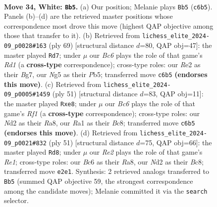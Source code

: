 \documentclass[11pt]{article}
\begin{document}
\clearpage

\begin{figure}[p]\centering
\begin{subfigure}{0.46\textwidth}\centering
\resizebox{\linewidth}{!}{%
\newchessgame
\chessboard[
  setfen={1qb2k2/r4p2/2B2np1/6Np/P7/1p4P1/3NRP1P/R6K w - - 2 34},
  showmover=false,
  pgfstyle=straightmove, color=movearrow, markmove={c6-b5}
]}
\caption{}
\end{subfigure}\hfill
\begin{subfigure}{0.46\textwidth}\centering
\resizebox{\linewidth}{!}{%
\newchessgame
\chessboard[
  setfen={3r2k1/6b1/p5pn/1pB1p3/1P1pN1P1/r4PK1/8/3R3R b - - 0 35},
  showmover=false,
  pgfstyle=straightmove, color=movearrow, markmove={d8-d7}
]}
\caption{}
\end{subfigure}
\\[4pt]
\begin{subfigure}{0.46\textwidth}\centering
\resizebox{\linewidth}{!}{%
\newchessgame
\chessboard[
  setfen={r1b1Nrk1/pp3p2/4pQp1/3p4/3P4/4P3/5P1P/2R4K b - - 0 26},
  showmover=false,
  pgfstyle=straightmove, color=movearrow, markmove={f8-e8}
]}
\caption{}
\end{subfigure}\hfill
\begin{subfigure}{0.46\textwidth}\centering
\resizebox{\linewidth}{!}{%
\newchessgame
\chessboard[
  setfen={r1b1r1k1/pp3p1n/3P2p1/2N5/3p1QP1/7P/PPP2KB1/8 b - - 7 26},
  showmover=false,
  pgfstyle=straightmove, color=movearrow, markmove={e8-d8}
]}
\caption{}
\end{subfigure}
\caption{\textbf{Move 34, White: \texttt{Bb5}.} (a) Our position; Melanie plays \texttt{Bb5} (\texttt{c6b5}). Panels (b)--(d) are the retrieved master positions whose correspondence most drove this move (highest QAP objective among those that transfer to it). (b) Retrieved from \texttt{lichess\_elite\_2024-09\_p0028\#163} (ply 69) [structural distance $d$=80, QAP obj=47]: the master played \texttt{Rd7}; under $\mu$ our \emph{Bc6} plays the role of that game's \emph{Rd1} (a \textbf{cross-type} correspondence); cross-type roles: our \emph{R}e2 as their \emph{B}g7, our \emph{N}g5 as their \emph{P}b5; transferred move \texttt{c6b5} \textbf{(endorses this move)}. (c) Retrieved from \texttt{lichess\_elite\_2024-09\_p0005\#1459} (ply 51) [structural distance $d$=83, QAP obj=11]: the master played \texttt{Rxe8}; under $\mu$ our \emph{Bc6} plays the role of that game's \emph{Rf1} (a \textbf{cross-type} correspondence); cross-type roles: our \emph{N}d2 as their \emph{R}a8, our \emph{R}a1 as their \emph{B}c8; transferred move \texttt{c6b5} \textbf{(endorses this move)}. (d) Retrieved from \texttt{lichess\_elite\_2024-09\_p0021\#832} (ply 51) [structural distance $d$=75, QAP obj=66]: the master played \texttt{Rd8}; under $\mu$ our \emph{Re2} plays the role of that game's \emph{Re1}; cross-type roles: our \emph{B}c6 as their \emph{R}a8, our \emph{N}d2 as their \emph{B}c8; transferred move \texttt{e2e1}. Synthesis: 2 retrieved analogs transferred to \texttt{Bb5} (summed QAP objective 59, the strongest correspondence among the candidate moves); Melanie committed it via the \texttt{search} selector.}
\label{fig:thought-m66}
\end{figure}
\end{document}
